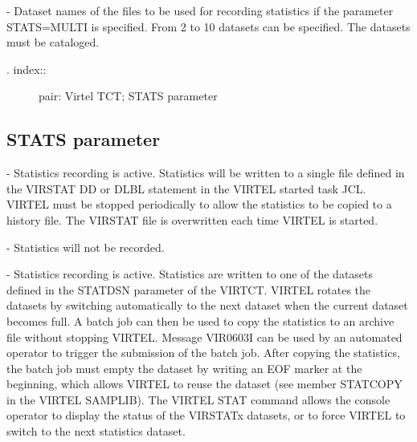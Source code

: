 \documentclass[letterpaper,10pt,english]{sphinxmanual}
\begin{document}
 - Dataset names of the files to be used for recording statistics if the parameter STATS=MULTI is specified. From 2 to 10 datasets can be specified. The datasets must be cataloged.
\begin{description}
\item[{. index::}] \leavevmode
pair: Virtel TCT; STATS parameter

\end{description}


\subsection{STATS parameter}
\label{\detokenize{Installation_Guide:stats-parameter}}
\begin{sphinxVerbatim}[commandchars=\\\{\}]
     
\end{sphinxVerbatim}

 - Statistics recording is active. Statistics will be written to a single file defined in the VIRSTAT DD or DLBL statement in the VIRTEL started task JCL. VIRTEL must be stopped periodically to allow the statistics to be copied to a history file. The VIRSTAT file is overwritten each time VIRTEL is started.

 - Statistics will not be recorded.

 - Statistics recording is active. Statistics are written to one of the datasets defined in the STATDSN parameter of the VIRTCT. VIRTEL rotates the datasets by switching automatically to the next dataset when the current dataset becomes full. A batch job can then be used to copy the statistics to an archive file without stopping VIRTEL. Message VIR0603I can be used by an automated operator to trigger the submission of the batch job. After copying the statistics, the batch job must empty the dataset by writing an EOF marker at the beginning, which allows VIRTEL to reuse the dataset (see member STATCOPY in the VIRTEL SAMPLIB).
The VIRTEL STAT command allows the console operator to display the status of the VIRSTATx datasets, or to force VIRTEL to switch to the next statistics dataset.
\end{document}
